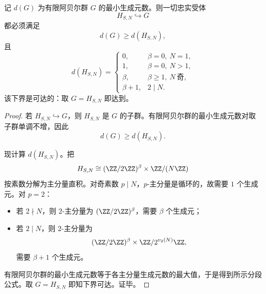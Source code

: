 \begin{theorem}[忠实有限阿贝尔受体的最小生成元数]\label{thm:conclusion-mixed-hiddenstate-minimal-generator-number}
记 \(d(G)\) 为有限阿贝尔群 \(G\) 的最小生成元数。则一切忠实受体
\[
H_{S,N}\hookrightarrow G
\]
都必须满足
\[
d(G)\ge d(H_{S,N}),
\]
且
\[
d(H_{S,N})=
\begin{cases}
0,& \beta=0,\ N=1,\\[1mm]
1,& \beta=0,\ N>1,\\[1mm]
\beta,& \beta\ge 1,\ N\ \text{奇},\\[1mm]
\beta+1,& 2\mid N.
\end{cases}
\]
该下界是可达的：取 \(G=H_{S,N}\) 即达到。
\end{theorem}
\begin{proof}
若 \(H_{S,N}\hookrightarrow G\)，则 \(H_{S,N}\) 是 \(G\) 的子群。有限阿贝尔群的最小生成元数对取子群单调不增，因此
\[
d(G)\ge d(H_{S,N}).
\]

现计算 \(d(H_{S,N})\)。把
\[
H_{S,N}\cong (\ZZ/2\ZZ)^\beta\times \ZZ/(N\ZZ)
\]
按素数分解为主分量直积。对奇素数 \(p\mid N\)，\(p\)-主分量是循环的，故需要 \(1\) 个生成元。对 \(p=2\)：
\begin{itemize}
  \item 若 \(2\nmid N\)，则 \(2\)-主分量为 \((\ZZ/2\ZZ)^\beta\)，需要 \(\beta\) 个生成元；
  \item 若 \(2\mid N\)，则 \(2\)-主分量为
  \[
  (\ZZ/2\ZZ)^\beta\times \ZZ/2^{v_2(N)}\ZZ,
  \]
  需要 \(\beta+1\) 个生成元。
\end{itemize}
有限阿贝尔群的最小生成元数等于各主分量生成元数的最大值，于是得到所示分段公式。取 \(G=H_{S,N}\) 即知下界可达。证毕。
\end{proof}

